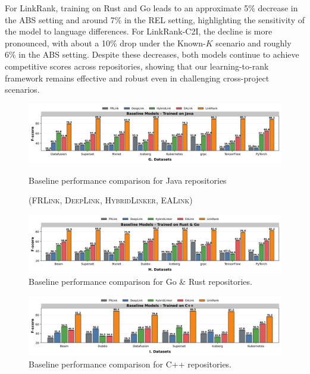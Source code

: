 For LinkRank, training on Rust and Go leads to an approximate 5\% decrease in the ABS setting and around 7\% in the REL setting, highlighting the sensitivity of the model to language differences. For LinkRank-C2I, the decline is more pronounced, with about a 10\% drop under the Known-$K$ scenario and roughly 6\% in the ABS setting.  Despite these decreases, both models continue to achieve competitive scores across repositories, showing that our learning-to-rank framework remains effective and robust even in challenging cross-project scenarios.


\begin{figure}[H]
  \centering
  \includegraphics[width=\linewidth]{Figures/baseline_java.png}
  \caption{Baseline performance comparison for Java repositories}
  \caption*{(\textsc{FRLink}, \textsc{DeepLink}, \textsc{HybridLinker}, \textsc{EALink})}
  \label{fig:baseline_java}
\end{figure}

\begin{figure}[H]
  \centering
  \includegraphics[width=\linewidth]{Figures/baseline_rust_go.png}
  \caption{Baseline performance comparison for Go \& Rust repositories.}
  \label{fig:baseline_rust_go}
\end{figure}

\begin{figure}[H]
  \centering
  \includegraphics[width=\linewidth]{Figures/baseline_cpp.png}
  \caption{Baseline performance comparison for C++ repositories.}
  \label{fig:baseline_cpp}
\end{figure}

